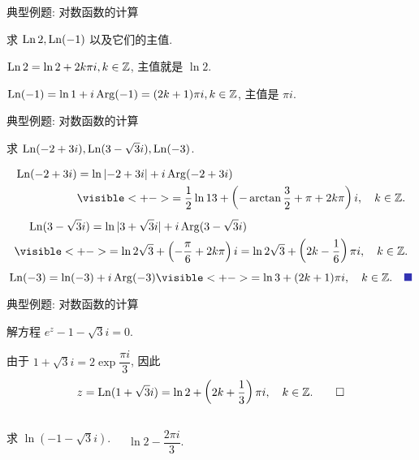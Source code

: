 \begin{frame}{典型例题: 对数函数的计算}
\begin{example}
求 $\operatorname{Ln} 2,\operatorname{Ln}(-1)$ 以及它们的主值.
\end{example}

\begin{solution}
$\operatorname{Ln}2=\ln2+2k\pi i, k\in{\mathbb{Z}}$,
\onslide<+->
主值就是 $\ln 2$.

\onslide<+->
$\operatorname{Ln}(-1)=\ln1+i\operatorname{Arg}(-1)=(2k+1)\pi i, k\in{\mathbb{Z}}$,
\onslide<+->
主值是 $\pi i$.
\end{solution}
\end{frame}


\begin{frame}{典型例题: 对数函数的计算}
\begin{example}
求 $\operatorname{Ln}(-2+3i),\operatorname{Ln}(3-\sqrt3 i),\operatorname{Ln}(-3)$.
\end{example}
\begin{solutions}
\vspace{-\baselineskip}
\begin{align*}
\Ln(-2+3i)&=\ln\abs{-2+3i}+i\Arg(-2+3i)\\
&\visible<+->{=\frac 12\ln 13+\left(-\arctan\frac 32+\pi+2k\pi\right)i,\quad k\in\BZ.}
\end{align*}
\onslide<+->
\vspace{-\baselineskip}
\begin{align*}
&\peq\Ln(3-\sqrt3i)=\ln|3+\sqrt 3i|+i\Arg(3-\sqrt 3i)\\
&\visible<+->{=\ln 2\sqrt 3+\left(-\frac\pi6+2k\pi\right)i
=\ln 2\sqrt 3+\left(2k-\frac16\right)\pi i,\quad k\in\BZ.}
\end{align*}
\onslide<+->
\vspace{-\baselineskip}
\[\Ln(-3)=\ln(-3)+i\Arg(-3)
\visible<+->{=\ln3+(2k+1)\pi i,\quad k\in\BZ.\mqed}\]
\vspace{-\baselineskip}
\end{solutions}
\end{frame}


\begin{frame}[<*>]{典型例题: 对数函数的计算}
\onslide<+->
\begin{example}
解方程 $e^z-1-\sqrt 3i=0$.
\end{example}
\onslide<+->
\begin{solution}
由于 $1+\sqrt 3 i=2\exp\dfrac{\pi i}3$,
\onslide<+->
因此
\[z=\operatorname{Ln}(1+\sqrt 3i)=\ln 2+\left(2k+\frac13\right)\pi i,\quad k\in{\mathbb{Z}}.\qedhere\]
\end{solution}
\onslide<+->
\begin{columns}
		\begin{exercise}
		求 $\ln(-1-\sqrt3 i)$.
		\end{exercise}
		\onslide<+->
		\begin{answer}
		$\ln 2-\dfrac{2\pi i}3$.
		\end{answer}
\end{columns}
\end{frame}


